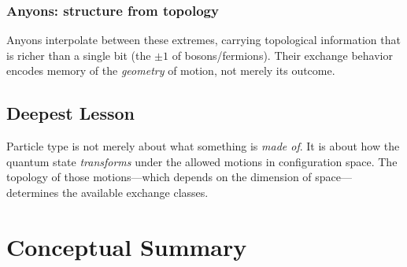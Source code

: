 \documentclass[11pt,a4paper]{article}
\newenvironment{keyidea}{%
  \begin{tcolorbox}[colback=themeblue!7, colframe=themeblue!50,
    title=Key Idea, fonttitle=\bfseries\small\color{themeblue}]
}{%
  \end{tcolorbox}
}
\begin{document}
\subsubsection{Anyons: structure from topology}

Anyons interpolate between these extremes, carrying topological information
that is richer than a single bit (the $\pm 1$ of bosons/fermions).  Their
exchange behavior encodes memory of the \emph{geometry} of motion, not
merely its outcome.

\subsection{Deepest Lesson}

\begin{keyidea}
  Particle type is not merely about what something is \emph{made of}.  It is
  about how the quantum state \emph{transforms} under the allowed motions in
  configuration space.  The topology of those motions---which depends on the
  dimension of space---determines the available exchange classes.
\end{keyidea}

\section{Conceptual Summary}
\end{document}
